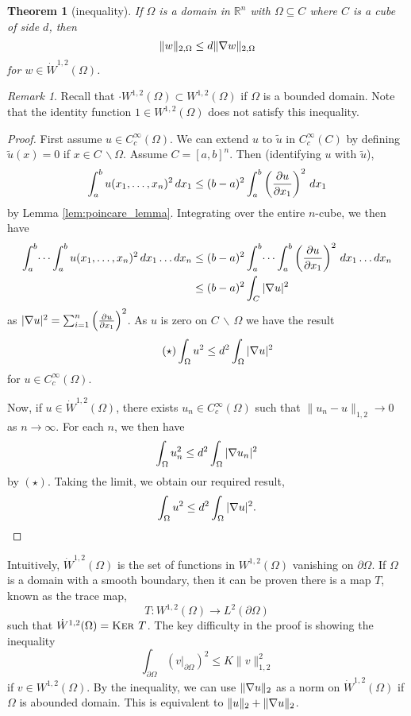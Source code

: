 \documentclass[10pt, oneside, reqno]{amsart}
\theoremstyle{plain}%
\newtheorem{thm}{Theorem}[section]
\numberwithin{equation}{section}
\theoremstyle{definition}
\theoremstyle{remark}
\newtheorem*{rem}{Remark}
\newcommand{\R}{\mathbb{R}}
\renewcommand{\ker}{\textsc{Ker\ }}
\begin{document}
\begin{thm}[\poincare inequality]
	\label{thm:poincare_inequality}
	If $\Omega$ is a domain in $\R^n$ with $\Omega \subseteq C$ where $C$ is a cube of side $d$, then 
	\begin{equation}
		\label{eq:poincare_inequality}
		\| w \|_{2, \Omega} \leq d \| \nabla w \|_{2, \Omega}
	\end{equation}
	for $w \in \dot W^{1, 2}(\Omega)$.
\end{thm}

\begin{rem}
	Recall that $\cdot W^{1, 2}(\Omega) \subset W^{1, 2}(\Omega)$ if $\Omega$ is a bounded domain.  Note that the identity function $1 \in W^{1, 2}(\Omega)$ does not satisfy this inequality.
\end{rem}

\begin{proof}
	First assume $u \in C^\infty_c(\Omega)$.  We can extend $u$ to $\tilde u$ in $C^\infty_c(C)$ by defining $\tilde u(x) = 0$ if $x \in C \, \backslash \Omega$.  Assume $C = [a, b]^n$.  Then (identifying $u$ with $\tilde u$), \begin{align*}
		\int_a^b  u(x_1, \dots, x_n)^2 \, dx_1 \leq (b-a)^2 \int_a^b \left(\frac{\partial u}{\partial x_1} \right)^2 \, dx_1
	\end{align*} by Lemma \ref{lem:poincare_lemma}.  Integrating over the entire $n$-cube, we then have \begin{align*}
		\int_a^b \dots \int_a^b u(x_1, \dots, x_n)^2 \, dx_1 \dots dx_n &\leq (b-a)^2 \int_a^b \dots \int_a^b \left(\frac{\partial u}{\partial x_1} \right)^2 \, dx_1 \dots dx_n \\
		&\leq (b-a)^2 \int_C |\nabla u|^2 
	\end{align*} as $|\nabla u |^2 = \sum_{i=1}^n \left(\frac{\partial u}{\partial x_1} \right)^2$.  As $u$ is zero on $C \, \backslash \, \Omega$ we have the result \[
	\tag{$\star$}
		\int_\Omega u^2 \leq d^2 \int_\Omega |\nabla u|^2
	\] for $u \in C^\infty_c(\Omega)$.  
	
	Now, if $u \in \dot W^{1, 2}(\Omega)$, there exists $u_n \in C^\infty_c(\Omega)$ such that $\| u_n - u \|_{1, 2} \rightarrow 0$ as $n \rightarrow \infty$.  For each $n$, we then have \[
		\int_\Omega u_n^2 \leq d^2 \int_\Omega |\nabla u_n |^2
	\] by $(\star)$.  Taking the limit, we obtain our required result, \[
		\int_\Omega u^2 \leq d^2 \int_\Omega |\nabla u|^2. \qedhere
	\] 
\end{proof}

Intuitively, $\dot W^{1, 2}(\Omega)$ is the set of functions in $W^{1, 2}(\Omega)$ vanishing on $\partial \Omega$.  If $\Omega$ is a domain with a smooth boundary, then it can be proven there is a map $T$, known as the trace map, \[
	T : W^{1, 2}(\Omega) \rightarrow L^2(\partial \Omega)
\] such that $\dot W^{1, 2}(\Omega) = \ker T$.   The key difficulty in the proof is showing the inequality \[
	\int_{\partial \Omega} \left(v|_{\partial \Omega}\right)^2 \leq K \| v \|_{1, 2}^2
\] if $v \in W^{1, 2}(\Omega)$.  By the \poincare inequality, we can use $\| \nabla u \|_2$ as a norm on $\dot W^{1, 2}(\Omega)$ if $\Omega$ is abounded domain.  This is equivalent to $\|u \|_2 + \| \nabla u \|_2$.  
\end{document}
